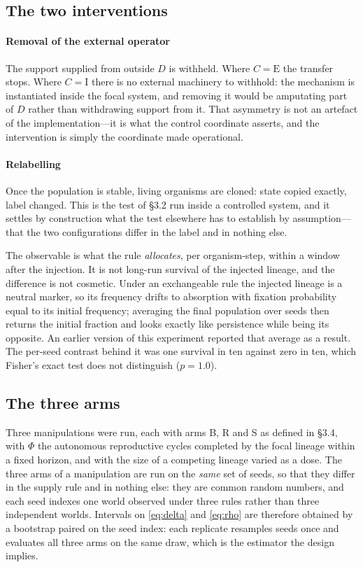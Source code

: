 \documentclass[review,3p,times]{elsarticle}
\begin{document}
\subsection{The two interventions}

\paragraph{Removal of the external operator}
The support supplied from outside $D$ is withheld. Where $C=\mathrm{E}$ the
transfer stops. Where $C=\mathrm{I}$ there is no external machinery to withhold:
the mechanism is instantiated inside the focal system, and removing it would be
amputating part of $D$ rather than withdrawing support from it. That asymmetry
is not an artefact of the implementation---it is what the control coordinate
asserts, and the intervention is simply the coordinate made operational.

\paragraph{Relabelling}
Once the population is stable, living organisms are cloned: state copied
exactly, label changed. This is the test of \S3.2 run inside a controlled
system, and it settles by construction what the test elsewhere has to
establish by assumption---that the two configurations differ in the label and
in nothing else.

The observable is what the rule \emph{allocates}, per organism-step, within a
window after the injection. It is not long-run survival of the injected
lineage, and the difference is not cosmetic. Under an exchangeable rule the
injected lineage is a neutral marker, so its frequency drifts to absorption
with fixation probability equal to its initial frequency; averaging the final
population over seeds then returns the initial fraction and looks exactly like
persistence while being its opposite. An earlier version of this experiment
reported that average as a result. The per-seed contrast behind it was one
survival in ten against zero in ten, which Fisher's exact test does not
distinguish ($p=1.0$).

\subsection{The three arms}

Three manipulations were run, each with arms B, R and S as defined in \S3.4,
with $\Phi$ the autonomous reproductive cycles completed by the focal lineage
within a fixed horizon, and with the size of a competing lineage varied as a
dose. The three arms of a manipulation are run on the \emph{same} set of
seeds, so that they differ in the supply rule and in nothing else: they are
common random numbers, and each seed indexes one world observed under three
rules rather than three independent worlds. Intervals on \eqref{eq:delta} and
\eqref{eq:rho} are therefore obtained by a bootstrap paired on the seed index:
each replicate resamples seeds once and evaluates all three arms on the same
draw, which is the estimator the design implies.
\end{document}
